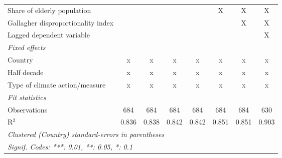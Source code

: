 \begin{tabular}{lccccccc}
   Share of elderly population                                             &                &                &                &                & X             & X             & X\\  
   Gallagher disproportionality index                                      &                &                &                &                &               & X             & X\\  
   Lagged dependent variable                                               &                &                &                &                &               &               & X\\  
   \emph{Fixed effects}\\
   Country                                                                 & x              & x              & x              & x              & x             & x             & x\\  
   Half decade                                                             & x              & x              & x              & x              & x             & x             & x\\  
   Type of climate action/measure                                          & x              & x              & x              & x              & x             & x             & x\\  
   \midrule \emph{Fit statistics}\\
   Observations                                                            & 684            & 684            & 684            & 684            & 684           & 684           & 630\\  
   R$^2$                                                                   & 0.836          & 0.838          & 0.842          & 0.842          & 0.851         & 0.851         & 0.903\\  
   \midrule
   \multicolumn{8}{l}{\emph{Clustered (Country) standard-errors in parentheses}}\\
   \multicolumn{8}{l}{\emph{Signif. Codes: ***: 0.01, **: 0.05, *: 0.1}}\\
\end{tabular}
\par\endgroup


